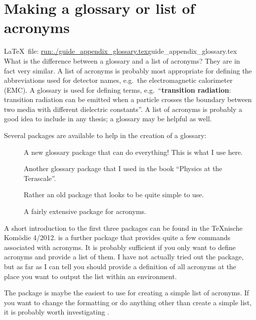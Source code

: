 
\chapter{Making a glossary or list of acronyms}%
\label{sec:app:glossary}

\LaTeX\ file: \url{run:./guide_appendix_glossary.tex}{guide\_appendix\_glossary.tex}\\[1ex]
\noindent
What is the difference between a glossary and a list of acronyms? They
are in fact very similar. A list of acronyms is probably most
appropriate for defining the abbreviations used for detector names,
e.g.\ the electromagnetic calorimeter (EMC). A glossary is used for
defining terms, e.g.\ \enquote{\textbf{transition radiation}: transition
radiation can be emitted when a particle crosses the boundary between
two media with different dielectric constants}. A list of acronyms is
probably a good idea to include in any thesis; a glossary may be
helpful as well.

Several packages are available to help in the creation of a glossary:
\begin{description}
\item[] A new glossary package that can do everything!
  This is what I use here.
\item[] Another glossary package that I used in the book
  \enquote{Physics at the Terascale}.
\item[] Rather an old package that looks to be quite
  simple to use.
\item[] A fairly extensive package for acronyms.
\end{description}

A short introduction to the first three packages can be found in the \TeX nische
Komödie 4/2012.
 is a further package that provides quite a few commands
associated with acronyms.
It is probably sufficient if you only want to define acronyms and provide a list of them.
I have not actually tried out the package,
but as far as I can tell you should provide a definition of all acronyms
at the place you want to output the list within an  environment.

The  package is maybe the easiest to use for creating
a simple list of acronyms. If you want to change the formatting or do
anything other than create a simple list, it is probably worth
investigating .

